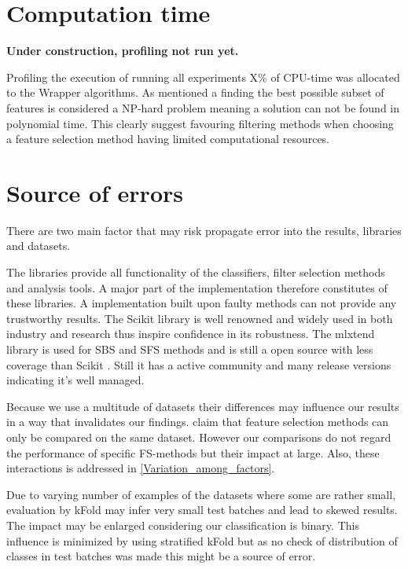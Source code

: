 \section{Computation time}

\textbf{Under construction, profiling not run yet.}

Profiling the execution of running all experiments X\% of CPU-time was allocated to the Wrapper algorithms. As mentioned a finding the best possible subset of features is considered a NP-hard problem meaning a solution can not be found in polynomial time. This clearly suggest favouring filtering methods when choosing a feature selection method having limited computational resources.

\section{Source of errors}
\label{sec:source_of_errors}

There are two main factor that may risk propagate error into the results, libraries and datasets.

The libraries provide all functionality of the classifiers, filter selection methods and analysis tools. A major part of the implementation therefore constitutes of these libraries. A implementation built upon faulty methods can not provide any trustworthy results. The Scikit library \parencite{scikit-learn} is well renowned and widely used in both industry and research thus inspire confidence in its robustness. The mlxtend library is used for SBS and SFS methods and is still a open source with less coverage than Scikit \parencite{mlextend}. Still it has a active community and many release versions indicating it's well managed.

Because we use a multitude of datasets their differences may influence our results in a way that invalidates our findings. \textcite{c201416} claim that feature selection methods can only be compared on the same dataset. However our comparisons do not regard the performance of specific FS-methods but their impact at large. Also, these interactions is addressed in \ref{Variation_among_factors}.

Due to varying number of examples of the datasets where some are rather small, evaluation by kFold may infer very small test batches and lead to skewed results. The impact may be enlarged considering our classification is binary. This influence is minimized by using stratified kFold but as no check of distribution of classes in test batches was made this might be a source of error.
